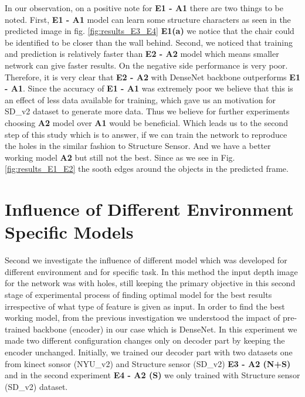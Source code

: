 In our observation, on a positive note for \textbf{E1 - A1} there are two things to be noted. First,  \textbf{E1 - A1} model can learn some structure characters as seen in the predicted image in fig. \ref{fig:results_E3_E4} \textbf{E1(a)} we notice that the chair could be identified to be closer than the wall behind. Second, we noticed that training and prediction is relatively  faster than \textbf{E2 - A2} model which means smaller network can give faster results. On the negative  side performance is very poor. 
Therefore, it is very clear that \textbf{E2 - A2} with DenseNet backbone outperforms \textbf{E1 - A1}. Since the accuracy of \textbf{E1 - A1} was extremely poor we believe that this is an effect of less data available for training, which gave us an motivation for SD\_v2  dataset to generate more data. Thus we believe for further experiments choosing \textbf{A2} model over \textbf{A1} would be beneficial. Which leads us to the second step of this study which is to answer, if we can train the network to reproduce the holes in the similar fashion to Structure Sensor. And we have a better working model \textbf{A2} but still not the best. Since as we see in Fig. \ref{fig:results_E1_E2} the sooth edges around the objects in the predicted frame. 
 


 

 \section{Influence of Different Environment Specific Models}
 \label{Chapter6:Transfer_Learning}
Second we investigate the influence of different model which was developed for different environment and for specific task. In this method the input depth image for the network was with holes, still keeping the primary objective in this second stage of experimental process of finding optimal model for the best results irrespective of what type of feature is given as input. In order to find the best working model, from the previous investigation we understood the impact of pre-trained backbone (encoder) in our case which is DenseNet. In this experiment we made two different configuration changes only on decoder part by keeping the encoder unchanged. Initially, we trained our decoder part with two datasets one from kinect sonsor (NYU\_v2) and Structure sensor (SD\_v2) \textbf{E3 - A2 (N+S)} and in the second experiment \textbf{E4 - A2 (S)} we only trained with Structure sensor (SD\_v2) dataset. 


